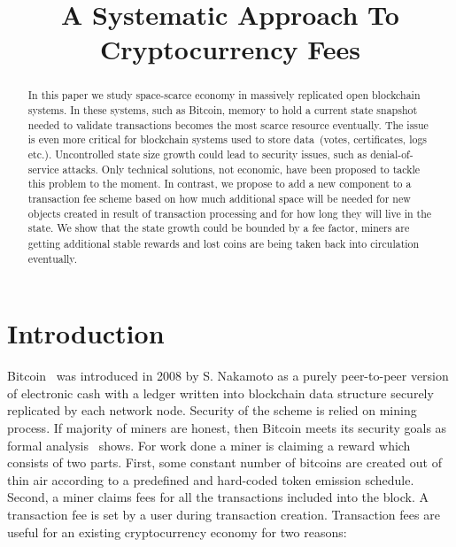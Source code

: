 \documentclass[]{llncs}   %
\newcommand{\authnote}[2]{\marginpar{\parbox{\marginparwidth}{\tiny %
  \textsf{#1 {\textcolor{blue}{notes: #2}}}}}%
  \textcolor{blue}{\textbf{\dag}}}
\newcommand{\authnote}[2]{
  \textsf{#1\textcolor{blue}{ #2}}}
\newcommand{\authnote}[2]{}
\newcommand{\knote}[1]{{\authnote{\textcolor{green}{Alex notes:}}{#1}}}
\begin{document}
\title{A Systematic Approach To Cryptocurrency Fees}


\maketitle

\begin{abstract}

In this paper we study space-scarce economy in massively replicated open
blockchain systems. In these systems, such as Bitcoin, memory to hold a current
state snapshot needed to validate transactions becomes the most scarce resource
eventually. The issue is even more critical for blockchain systems used to store
data~(votes, certificates, logs etc.). Uncontrolled state size growth could lead
to security issues, such as denial-of-service attacks. Only technical solutions,
not economic, have been proposed to tackle this problem to the moment. In
contrast, we propose to add a new component to a transaction fee scheme based on
how much additional space will be needed for new objects created in result of
transaction processing and for how long they will live in the state. \knote{write abt fee adjustment rule} 
\knote{rewrite further} 
 We show that the state growth could be bounded by a fee factor, miners
are getting additional stable rewards and lost coins are being taken back into
circulation eventually.    \knote{check this}

\end{abstract}

\section{Introduction}

Bitcoin~\cite{Nakamoto2008} was introduced in 2008 by S. Nakamoto as a purely
peer-to-peer version of electronic cash with a ledger written into blockchain
data structure securely replicated by each network node. Security of the scheme
is relied on mining process. If majority of miners are honest, then Bitcoin
meets its security goals as formal analysis~\cite{Garay2015} shows. For work
done a miner is claiming a reward which consists of two parts. First, some
constant number of bitcoins are created out of thin air according to a
predefined and hard-coded token emission schedule. Second, a miner claims fees
for all the transactions included into the block. A transaction fee is set by a
user during transaction creation. Transaction fees are useful for an existing
cryptocurrency economy for two reasons:
\end{document}
